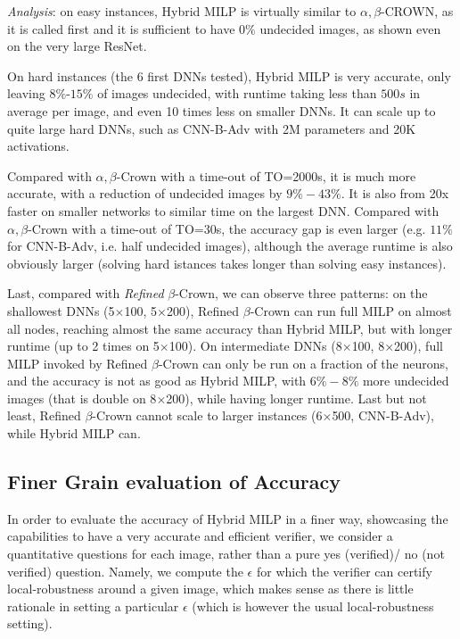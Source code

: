 {\em Analysis}: on easy instances, Hybrid MILP is virtually similar to $\alpha,\beta$-CROWN, 
as it is called first and it is sufficient to have $0\%$ undecided images, as shown even on the very large ResNet.

On hard instances (the 6 first DNNs tested), Hybrid MILP is very accurate, only leaving $8\%$-$15\%$ of images undecided, with runtime taking less than $500s$ in average per image, and even 10 times less on smaller DNNs. It can scale up to quite large hard DNNs, such as CNN-B-Adv with 2M parameters and 20K activations.

Compared with $\alpha,\beta$-Crown with a time-out of TO=2000s, it is much more accurate, with a reduction of undecided images by $9\%-43\%$. 
It is also from 20x faster on smaller networks to similar time on the largest DNN.
Compared with $\alpha,\beta$-Crown with a time-out of TO=30s, the accuracy gap is even larger (e.g. $11\%$ for CNN-B-Adv, i.e. half undecided images), although the average runtime is also obviously larger (solving hard istances takes longer than solving easy instances).

Last, compared with {\em Refined} $\beta$-Crown, we can observe three patterns: on the shallowest DNNs (5$\times$100, 5$\times$200), Refined $\beta$-Crown can run full MILP on almost all nodes, reaching almost the same accuracy than  Hybrid MILP, but with longer runtime (up to 2 times on 5$\times$100). On intermediate DNNs (8$\times$100, 8$\times$200), full MILP invoked by Refined $\beta$-Crown can only be run on a fraction of the neurons, and the accuracy is not as good as Hybrid MILP, with $6\%-8\%$ more undecided images (that is double on 8$\times$200), while having longer runtime. Last but not least, Refined $\beta$-Crown cannot scale to larger instances (6$\times$500, CNN-B-Adv), while Hybrid MILP can.


\subsection{Finer Grain evaluation of Accuracy}

In order to evaluate the accuracy of Hybrid MILP in a finer way, showcasing 
the capabilities to have a very accurate and efficient verifier, we consider
a quantitative questions for each image, rather than a pure yes (verified)/ no (not verified) question. Namely, we compute the $\epsilon$ for which the verifier can certify local-robustness around a given image, which makes sense as there is little rationale in setting a particular $\epsilon$ (which is however the usual local-robustness setting).

